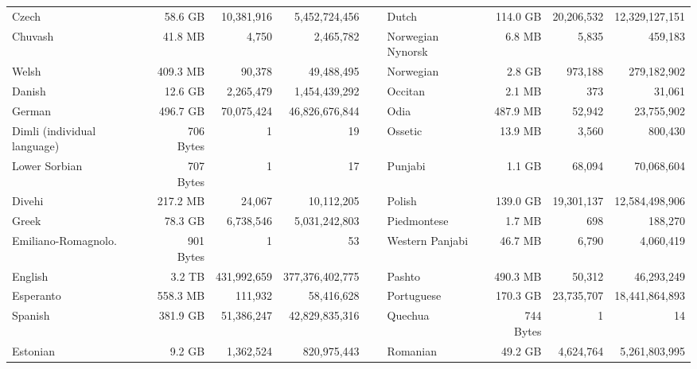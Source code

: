 \begin{table}[ht!]
{\begin{tabular}{lrrrclrrr}
            Czech                       & 58.6 GB   & 10,381,916  & 5,452,724,456   & ~ & Dutch             & 114.0 GB  & 20,206,532 & 12,329,127,151 \\
            Chuvash                     & 41.8 MB   & 4,750       & 2,465,782       & ~ & Norwegian Nynorsk & 6.8 MB    & 5,835      & 459,183        \\
            Welsh                       & 409.3 MB  & 90,378      & 49,488,495      & ~ & Norwegian         & 2.8 GB    & 973,188    & 279,182,902    \\
            Danish                      & 12.6 GB   & 2,265,479   & 1,454,439,292   & ~ & Occitan           & 2.1 MB    & 373        & 31,061         \\
            German                      & 496.7 GB  & 70,075,424  & 46,826,676,844  & ~ & Odia              & 487.9 MB  & 52,942     & 23,755,902     \\
            Dimli (individual language) & 706 Bytes & 1           & 19              & ~ & Ossetic           & 13.9 MB   & 3,560      & 800,430        \\
            Lower Sorbian               & 707 Bytes & 1           & 17              & ~ & Punjabi           & 1.1 GB    & 68,094     & 70,068,604     \\
            Divehi                      & 217.2 MB  & 24,067      & 10,112,205      & ~ & Polish            & 139.0 GB  & 19,301,137 & 12,584,498,906 \\
            Greek                       & 78.3 GB   & 6,738,546   & 5,031,242,803   & ~ & Piedmontese       & 1.7 MB    & 698        & 188,270        \\
            Emiliano-Romagnolo.         & 901 Bytes & 1           & 53              & ~ & Western Panjabi   & 46.7 MB   & 6,790      & 4,060,419      \\
            English                     & 3.2 TB    & 431,992,659 & 377,376,402,775 & ~ & Pashto            & 490.3 MB  & 50,312     & 46,293,249     \\
            Esperanto                   & 558.3 MB  & 111,932     & 58,416,628      & ~ & Portuguese        & 170.3 GB  & 23,735,707 & 18,441,864,893 \\
            Spanish                     & 381.9 GB  & 51,386,247  & 42,829,835,316  & ~ & Quechua           & 744 Bytes & 1          & 14             \\
            Estonian                    & 9.2 GB    & 1,362,524   & 820,975,443     & ~ & Romanian          & 49.2 GB   & 4,624,764  & 5,261,803,995  \\

\end{tabular}}
\end{table}
